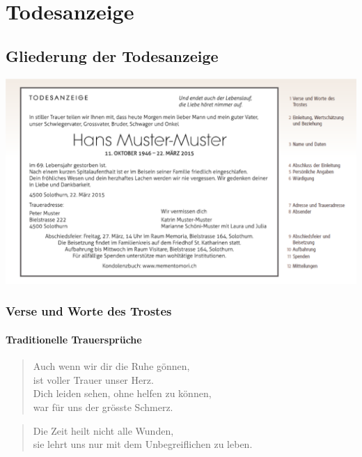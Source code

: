\documentclass[ngerman,a4paper,11pt]{scrreprt}
\begin{document}
\clearpage
\pagestyle{plain}

\tableofcontents

\part{Todesanzeige}
\label{sec-1}

\chapter{Gliederung der Todesanzeige}
\label{sec-1-1}

\includegraphics[width=\textwidth]{Bilder/MusterTodesanzeige.png}

\clearpage

\section{Verse und Worte des Trostes}
\label{sec-1-1-1}

\subsection{Traditionelle Trauersprüche}
\label{sec-1-1-1-1}

\begin{verse}
Auch wenn wir dir die Ruhe gönnen, \\
ist voller Trauer unser Herz. \\
Dich leiden sehen, ohne helfen zu können, \\
war für uns der grösste Schmerz. \\
\end{verse}

\begin{verse}
Die Zeit heilt nicht alle Wunden, \\
sie lehrt uns nur mit dem Unbegreiflichen zu leben. \\
\end{verse}
\end{document}
